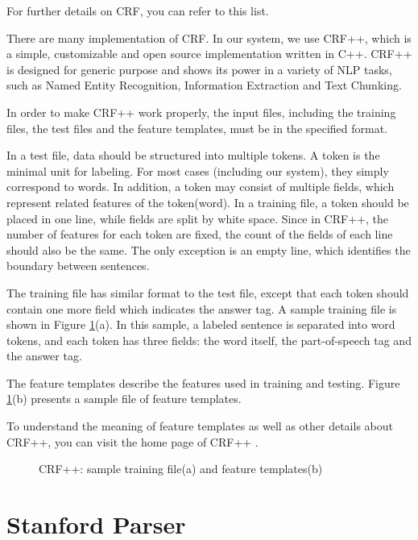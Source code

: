 For further details on CRF,
you can refer to this list\cite{CRFLafferty,wallach2004conditional,sutton2006introduction}.

There are many implementation of CRF. In our system, we use CRF++,
which is a simple, customizable and open source implementation written in C++. CRF++ is designed for generic purpose and shows its power in a variety of NLP tasks, such as Named Entity Recognition, Information Extraction and Text Chunking.

In order to make CRF++ work properly, the input files, including the training files, the test files and the feature templates, must be in the specified format.

In a test file, data should be structured into multiple tokens. A token is the minimal unit for labeling. For most cases (including our system), they simply correspond to words. In addition, a token may consist of multiple fields, which represent related features of the token(word).
In a training file, a token should be placed in one line, while fields are split by white space.
Since in CRF++, the number of features for each token are fixed, the count of the fields of each line should also be the same.
The only exception is an empty line, which identifies the boundary between sentences.

The training file has similar format to the test file, except that each token should contain one more field which indicates the answer tag. A sample training file is shown in Figure \ref{fig:crfpp}(a). In this sample, a labeled sentence is separated into word tokens, and each token has three fields:
the word itself, the part-of-speech tag and the answer tag.

The feature templates describe the features used in training and testing.
Figure \ref{fig:crfpp}(b) presents a sample file of feature templates.

To understand the meaning of feature templates as well as other details about CRF++, you can visit the home page of CRF++ \cite{crfppHome}.

\begin{figure}[th]
        \centering
        \caption{CRF++: sample training file(a) and feature templates(b)\cite{crfppHome}}
        \label{fig:crfpp}
\end{figure}

\section{Stanford Parser}
\label{sec:stanfordParser}


